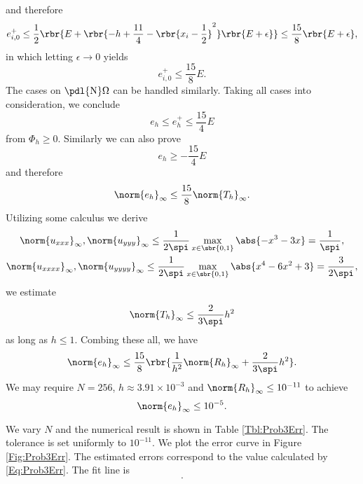\documentclass[english, nochinese]{pnote}
\newcommand\normi[1]{\norm{#1}_{\infty}}
\begin{document}
and therefore
\begin{equation}
e^+_{ i, 0 } \le \frac{1}{2} \rbr{ E + \rbr{ -h + \frac{11}{4} - \rbr{ x_i - \frac{1}{2} }^2 } \rbr{ E + \epsilon } } \le \frac{15}{8} \rbr{ E + \epsilon },
\end{equation}
in which letting $ \epsilon \rightarrow 0 $ yields
\begin{equation}
e^+_{ i, 0 } \le \frac{15}{8} E.
\end{equation}
The cases on $ \pdl{\text{N}} \Omega $ can be handled similarly. Taking all cases into consideration, we conclude
\begin{equation}
e_h \le e^+_h \le \frac{15}{4} E
\end{equation}
from $ \varPhi_h \ge 0 $. Similarly we can also prove
\begin{equation}
e_h \ge -\frac{15}{4} E
\end{equation}
and therefore
\begin{equation}
\normi{e_h} \le \frac{15}{8} \normi{T_h}.
\end{equation}
Utilizing some calculus we derive
\begin{gather}
\normi{u_{ x x x }}, \normi{u_{ y y y }} \le \frac{1}{ 2 \spi } \max_{ x \in \sbr{ 0, 1 } } \abs{ -x^3 - 3 x } = \frac{1}{\spi}, \\
\normi{u_{ x x x x }}, \normi{u_{ y y y y }} \le \frac{1}{ 2 \spi } \max_{ x \in \sbr{ 0, 1 } } \abs{ x^4 - 6 x^2 + 3 } = \frac{3}{ 2 \spi },
\end{gather}
we estimate
\begin{equation}
\normi{T_h} \le \frac{2}{ 3 \spi } h^2
\end{equation}
as long as $ h \le 1 $. Combing these all, we have
\begin{equation} \label{Eq:Prob3Err}
\normi{e_h} \le \frac{15}{8} \rbr{ \frac{1}{h^2} \normi{R_h} + \frac{2}{ 3 \spi } h^2 }.
\end{equation}
We may require $ N = 256 $, $ h \approx 3.91 \times 10^{-3} $ and $ \normi{R_h} \le 10^{-11} $ to achieve
\begin{equation}
\normi{e_h} \le 10^{-5}.
\end{equation}

We vary $N$ and the numerical result is shown in Table \ref{Tbl:Prob3Err}. The tolerance is set uniformly to $ 10^{-11} $. We plot the error curve in Figure \ref{Fig:Prob3Err}. The estimated errors correspond to the value calculated by \eqref{Eq:Prob3Err}. The fit line is
\begin{equation}
.
\end{equation}
\end{document}
